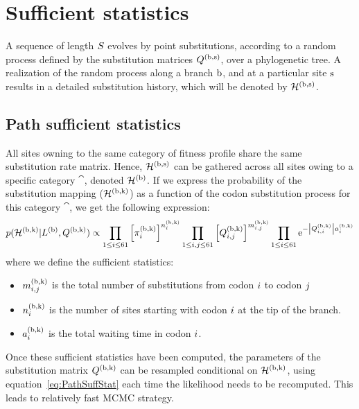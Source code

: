 \section{Sufficient statistics}
\label{sec:sufficient-statistics-mutselne}

A sequence of length $S$ evolves by point \glspl{substitution}, according to a random process defined by the \gls{substitution} matrices $Q^{(\text{b}, \text{s})}$, over a phylogenetic tree.
A realization of the random process along a branch $\text{b}$, and at a particular site $\text{s}$ results in a detailed \gls{substitution} history, which will be denoted by $\mathcal{H}^{(\text{b}, \text{s})}$.

\subsection{Path sufficient statistics}
All sites owning to the same category of fitness profile share the same \gls{substitution} rate matrix.
Hence, $\mathcal{H}^{(\text{b}, \text{s})}$ can be gathered across all sites owing to a specific category $\cat$, denoted $\mathcal{H}^{(\text{b})}$.
If we express the probability of the \gls{substitution} mapping ($\mathcal{H}^{(\text{b}, \text{k})}$) as a function of the \gls{codon} \gls{substitution} process for this category $\cat$, we get the following expression:
\begin{equation}
    \label{eq:PathSuffStat}
    p(\mathcal{H}^{(\text{b}, \text{k})} | L^{(\text{b})}, Q^{(\text{b}, \text{k})}) \propto \prod_{1 \leq {i} \leq 61} \left[\pi_{{i}}^{(\text{b}, \text{k})}\right]^{n_{{i}}^{(\text{b}, \text{k})}} \prod_{ 1 \leq {i}, {j} \leq 61} \left[Q^{(\text{b}, \text{k})}_{{i}, {j}}\right]^{m_{{i}, {j}}^{(\text{b}, \text{k})}} \prod_{1 \leq {i} \leq 61} \mathrm{e}^{- \left| Q^{(\text{b}, \text{k})}_{{i}, {i}}\right| a_{{i}}^{(\text{b}, \text{k})}}
\end{equation}
where we define the sufficient statistics:
\begin{itemize}
    \setlength\itemsep{-0.25em}
    \item $m_{{i}, {j}}^{(\text{b}, \text{k})}$ is the total number of \glspl{substitution} from \gls{codon} ${i}$ to \gls{codon} ${j}$
    \item $n_{{i}}^{(\text{b}, \text{k})}$ is the number of sites starting with \gls{codon} ${i}$ at the tip of the branch.
    \item $a_{{i}}^{(\text{b}, \text{k})}$ is the total waiting time in \gls{codon} ${i}$.
\end{itemize}
Once these sufficient statistics have been computed, the parameters of the \gls{substitution} matrix $Q^{(\text{b}, \text{k})}$ can be resampled conditional on $\mathcal{H}^{(\text{b}, \text{k})}$,
using equation~\ref{eq:PathSuffStat} each time the \gls{likelihood} needs to be recomputed. This leads to relatively fast \acrshort{MCMC} strategy.

